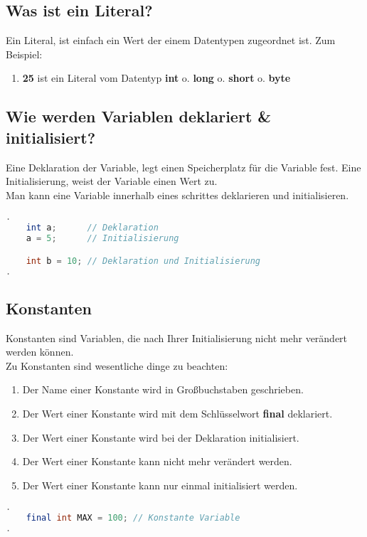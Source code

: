 \documentclass[12pt, a4paper]{article}
\begin{document}
\subsection*{Was ist ein Literal?}
Ein Literal, ist einfach ein Wert der einem Datentypen zugeordnet ist. Zum Beispiel:
\begin{enumerate}[label=]
    \item \textbf{25} ist ein Literal vom Datentyp \textbf{int} o. \textbf{long} o. \textbf{short} o. \textbf{byte}
\end{enumerate}
\subsection*{Wie werden Variablen deklariert \& initialisiert?}
Eine Deklaration der Variable, legt einen Speicherplatz für die Variable fest. Eine Initialisierung, weist der Variable einen Wert zu. \\
Man kann eine Variable innerhalb eines schrittes deklarieren und initialisieren.
\begin{lstlisting}[language=java,title=Beispiele]
.
    int a;      // Deklaration
    a = 5;      // Initialisierung

    int b = 10; // Deklaration und Initialisierung    
.
\end{lstlisting}
\subsection*{Konstanten}
Konstanten sind Variablen, die nach Ihrer Initialisierung nicht mehr verändert werden können. \\
Zu Konstanten sind wesentliche dinge zu beachten:
\begin{enumerate}[label=$\alph*)$]
    \item Der Name einer Konstante wird in Großbuchstaben geschrieben.
    \item Der Wert einer Konstante wird mit dem Schlüsselwort \textbf{final} deklariert.
    \item Der Wert einer Konstante wird bei der Deklaration initialisiert.
    \item Der Wert einer Konstante kann nicht mehr verändert werden.
    \item Der Wert einer Konstante kann nur einmal initialisiert werden.
\end{enumerate}
\begin{lstlisting}[language=java,title=Beispiel]
.
    final int MAX = 100; // Konstante Variable
.
\end{lstlisting}
\newpage
\end{document}
